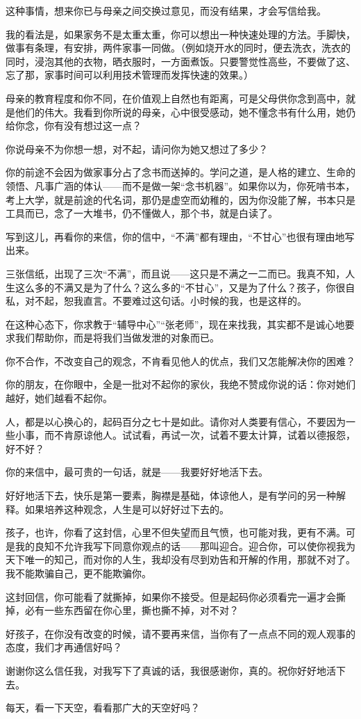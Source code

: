 \par 这种事情，想来你已与母亲之间交换过意见，而没有结果，才会写信给我。
\par 我的看法是，如果家务不是太重太重，你可以想出一种快速处理的方法。手脚快，做事有条理，有安排，两件家事一同做。（例如烧开水的同时，便去洗衣，洗衣的同时，浸泡其他的衣物，晒衣服时，一方面煮饭。只要警觉性高些，不要做了这、忘了那，家事时间可以利用技术管理而发挥快速的效果。）
\par 母亲的教育程度和你不同，在价值观上自然也有距离，可是父母供你念到高中，就是他们的伟大。我看到你所说的母亲，心中很受感动，她不懂念书有什么用，她仍给你念，你有没有想过这一点？
\par 你说母亲不为你想一想，对不起，请问你为她又想过了多少？
\par 你的前途不会因为做家事分占了念书而送掉的。学问之道，是人格的建立、生命的领悟、凡事广涵的体认——而不是做一架“念书机器”。如果你以为，你死啃书本，考上大学，就是前途的代名词，那仍是虚空而幼稚的，因为你没能了解，书本只是工具而已，念了一大堆书，仍不懂做人，那个书，就是白读了。
\par 写到这儿，再看你的来信，你的信中，“不满”都有理由，“不甘心”也很有理由地写出来。
\par 三张信纸，出现了三次“不满”，而且说——这只是不满之一二而已。我真不知，人生这么多的不满又是为了什么？这么多的“不甘心”，又是为了什么？孩子，你很自私，对不起，恕我直言。不要难过这句话。小时候的我，也是这样的。
\par 在这种心态下，你求教于“辅导中心”“张老师”，现在来找我，其实都不是诚心地要求我们帮助你，而是将我们当做发泄的对象而已。
\par 你不合作，不改变自己的观念，不肯看见他人的优点，我们又怎能解决你的困难？
\par 你的朋友，在你眼中，全是一批对不起你的家伙，我绝不赞成你说的话：你对她们越好，她们越看不起你。
\par 人，都是以心换心的，起码百分之七十是如此。请你对人类要有信心，不要因为一些小事，而不肯原谅他人。试试看，再试一次，试着不要太计算，试着以德报怨，好不好？
\par 你的来信中，最可贵的一句话，就是——我要好好地活下去。
\par 好好地活下去，快乐是第一要素，胸襟是基础，体谅他人，是有学问的另一种解释。如果培养这种观念，人生是可以好好过下去的。
\par 孩子，也许，你看了这封信，心里不但失望而且气愤，也可能对我，更有不满。可是我的良知不允许我写下同意你观点的话——那叫迎合。迎合你，可以使你视我为天下唯一的知己，而对你的人生，我却没有尽到劝告和开解的作用，那就不对了。我不能欺骗自己，更不能欺骗你。
\par 这封回信，你可能看了就撕掉，如果你不接受。但是起码你必须看完一遍才会撕掉，必有一些东西留在你心里，撕也撕不掉，对不对？
\par 好孩子，在你没有改变的时候，请不要再来信，当你有了一点点不同的观人观事的态度，我们才再通信好吗？
\par 谢谢你这么信任我，对我写下了真诚的话，我很感谢你，真的。祝你好好地活下去。
\par 每天，看一下天空，看看那广大的天空好吗？
\par {}


